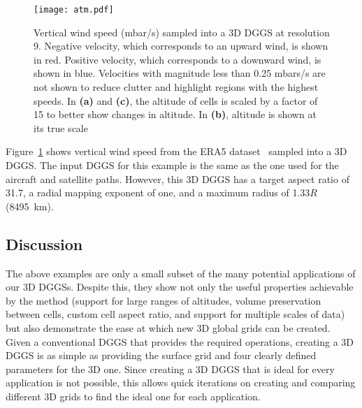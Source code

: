 \begin{figure}[h]
	\centering
	\texttt{[image: atm.pdf]}
	\caption{Vertical wind speed (mbar/s) sampled into a 3D DGGS at resolution 9.
		Negative velocity, which corresponds to an upward wind, is shown in red.
		Positive velocity, which corresponds to a downward wind, is shown in blue.
		Velocities with magnitude less than 0.25 mbars/s are not shown to reduce clutter and highlight regions with the highest speeds.
		In \textbf{(a)} and \textbf{(c)}, the altitude of cells is scaled by a factor of 15 to better show changes in altitude.
		In \textbf{(b)}, altitude is shown at its true scale}
	\label{fig:atmosphere}
\end{figure}


Figure~\ref{fig:atmosphere} shows vertical wind speed from the ERA5 dataset~\cite{era5} sampled into a 3D DGGS.
The input DGGS for this example is the same as the one used for the aircraft and satellite paths.
However, this 3D DGGS has a target aspect ratio of 31.7, a radial mapping exponent of one, and a maximum radius of 1.33$R$ (8495~km).


\subsection{Discussion}
The above examples are only a small subset of the many potential applications of our 3D DGGSs.
Despite this, they show not only the useful properties achievable by the method (support for large ranges of altitudes, volume preservation between cells, custom cell aspect ratio, and support for multiple scales of data) but also demonstrate the ease at which new 3D global grids can be created.
Given a conventional DGGS that provides the required operations, creating a 3D DGGS is as simple as providing the surface grid and four clearly defined parameters for the 3D one.
Since creating a 3D DGGS that is ideal for every application is not possible, this allows quick iterations on creating and comparing different 3D grids to find the ideal one for each application.